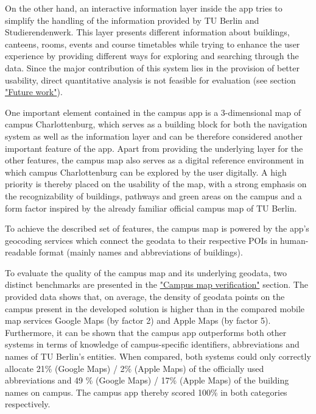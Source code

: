 
On the other hand, an interactive information layer inside the app tries to simplify the handling of the information provided by TU Berlin and Studierendenwerk. This layer presents different information about buildings, canteens, rooms, events and course timetables while trying to enhance the user experience by providing different ways for exploring and searching through the data. Since the major contribution of this system lies in the provision of better usability, direct quantitative analysis is not feasible for evaluation (see section \hyperref[sec:future_work]{"Future work"}).


One important element contained in the campus app is a 3-dimensional map of campus Charlottenburg, which serves as a building block for both the navigation system as well as the information layer and can be therefore considered another important feature of the app. Apart from providing the underlying layer for the other features, the campus map also serves as a digital reference environment in which campus Charlottenburg can be explored by the user digitally. A high priority is thereby placed on the usability of the map, with a strong emphasis on the recognizability of buildings, pathways and green areas on the campus and a form factor inspired by the already familiar official campus map of TU Berlin.

To achieve the described set of features, the campus map is powered by the app's geocoding services which connect the geodata to their respective POIs in human-readable format (mainly names and abbreviations of buildings).

To evaluate the quality of the campus map and its underlying geodata, two distinct benchmarks are presented in the \hyperref[sec:campus_map_verification]{"Campus map verification"} section. The provided data shows that, on average, the density of geodata points on the campus present in the developed solution is higher than in the compared mobile map services Google Maps (by factor 2) and Apple Maps (by factor 5). Furthermore, it can be shown that the campus app outperforms both other systems in terms of knowledge of campus-specific identifiers, abbreviations and names of TU Berlin's entities. When compared, both systems could only correctly allocate 21\% (Google Maps) / 2\% (Apple Maps) of the officially used abbreviations and 49 \% (Google Maps) / 17\% (Apple Maps) of the building names on campus. The campus app thereby scored 100\% in both categories respectively.

